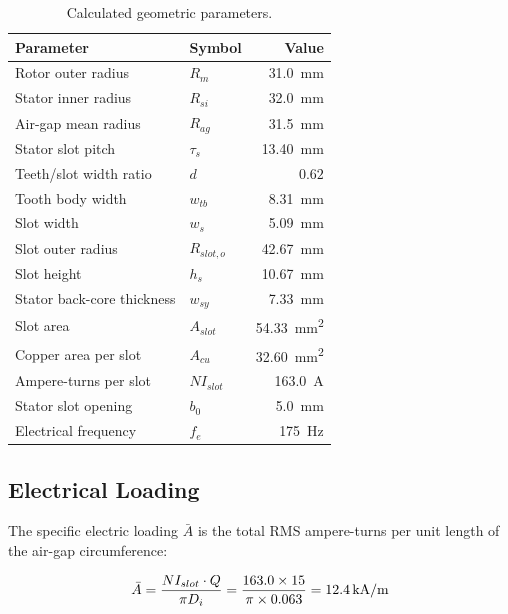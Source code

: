 \documentclass[12pt, a4paper]{article}
\begin{document}
\begin{table}[h!]
\centering
\caption{Calculated geometric parameters.}
\label{tab:q3_calc}
\begin{tabular}{llr}
\toprule
\textbf{Parameter} & \textbf{Symbol} & \textbf{Value} \\
\midrule
Rotor outer radius            & $R_m$          & \SI{31.0}{mm} \\
Stator inner radius           & $R_{si}$       & \SI{32.0}{mm} \\
Air-gap mean radius           & $R_{ag}$       & \SI{31.5}{mm} \\
Stator slot pitch             & $\tau_s$       & \SI{13.40}{mm} \\
Teeth/slot width ratio        & $d$            & $0.62$ \\
Tooth body width              & $w_{tb}$       & \SI{8.31}{mm} \\
Slot width                    & $w_s$          & \SI{5.09}{mm} \\
Slot outer radius             & $R_{slot,o}$   & \SI{42.67}{mm} \\
Slot height                   & $h_s$          & \SI{10.67}{mm} \\
Stator back-core thickness    & $w_{sy}$       & \SI{7.33}{mm} \\
Slot area                     & $A_{slot}$     & \SI{54.33}{mm^2} \\
Copper area per slot          & $A_{cu}$       & \SI{32.60}{mm^2} \\
Ampere-turns per slot         & $NI_{slot}$    & \SI{163.0}{A} \\
Stator slot opening           & $b_0$          & \SI{5.0}{mm} \\
Electrical frequency          & $f_e$          & \SI{175}{Hz} \\
\bottomrule
\end{tabular}
\end{table}


\subsection{Electrical Loading}

The specific electric loading $\bar{A}$ is the total RMS ampere-turns
per unit length of the air-gap circumference:

\begin{equation}
    \bar{A} = \frac{NI_{slot} \cdot Q}{\pi D_i}
            = \frac{163.0 \times 15}{\pi \times 0.063}
            = \mathbf{\SI{12{,}4}{kA/m}}
\end{equation}
\end{document}
